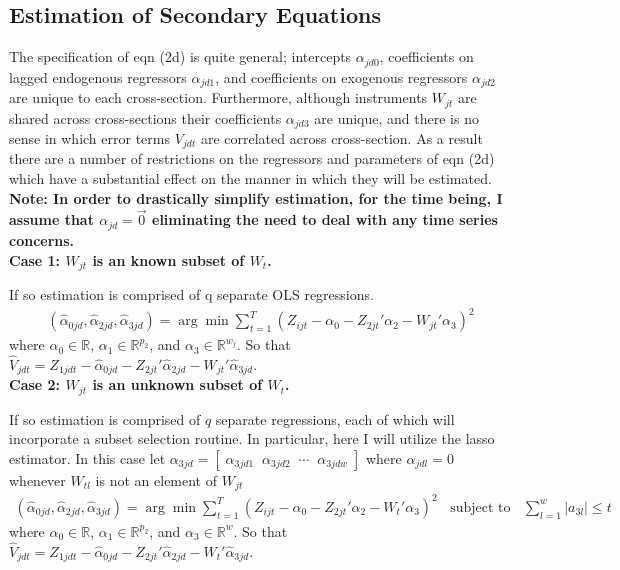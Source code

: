 \documentclass[10pt]{article}
\begin{document}
\subsection*{Estimation of Secondary Equations} 
The specification of eqn (2d) is quite general; intercepts $\alpha_{jd0}$, coefficients on lagged endogenous regressors $\alpha_{jd1}$, and coefficients on exogenous regressors $\alpha_{jd2}$ are unique to each cross-section. Furthermore, although instruments $W_{jt}$ are shared across cross-sections their coefficients $\alpha_{jd3}$ are unique, and there is no sense in which error terms $V_{jdt}$ are correlated across cross-section. As a result there are a number of restrictions on the regressors and parameters of  eqn (2d) which have a substantial effect on the manner in which they will be estimated. \\

\noindent \bf Note: \rm In order to drastically simplify estimation, for the time being, I assume that $\alpha_{jd} = \vec{0}$ eliminating the need to deal with any time series concerns. \\

\noindent \bf Case 1: \rm $W_{jt}$ is an known subset of $W_{t}$.   \

\noindent If so estimation is comprised of q separate OLS regressions.
\begin{align*} 
(\hat{\alpha}_{0jd}, \hat{\alpha}_{2jd},\hat{\alpha}_{3jd})  = \arg \min \sum_{t=1}^T\left(Z_{ijt} - \alpha_{0} -  Z_{2jt}'\alpha_{2} - W_{jt}'\alpha_{3} \right)^2
\end{align*}
where $\alpha_0 \in \mathbb{R}$, $\alpha_{1} \in \mathbb{R}^{p_2}$, and $\alpha_{3} \in \mathbb{R}^{w_j}$. So that $\hat{V}_{jdt} = Z_{1jdt} - \hat{\alpha}_{0jd} - Z_{2jt}'\hat{\alpha}_{2jd} - W_{jt}'\hat{\alpha}_{3jd}$. \\

\noindent\bf Case 2: \rm $W_{jt}$ is an unknown subset of $W_{t}$. \

\noindent If so estimation is comprised of $q$ separate regressions, each of  which will incorporate a subset selection routine. In particular, here I will utilize the lasso estimator. In this case let $\alpha_{3jd} =  [\;\alpha_{3jd1} \;\; \alpha_{3jd2} \;\; \cdots \;\; \alpha_{3jdw} \; ]$ where $\alpha_{jdl} = 0$ whenever $W_{tl}$ is not an element of $W_{jt}$
%
\begin{align*} 
(\hat{\alpha}_{0jd}, \hat{\alpha}_{2jd},\hat{\alpha}_{3jd})  = \arg \min \sum_{t=1}^T\left(Z_{ijt} - \alpha_{0} -  Z_{2jt}'\alpha_{2} - W_{t}'\alpha_{3} \right)^2 \;\; \text{ subject to } \;\; \sum_{l = 1}^w |a_{3l}| \leq t
\end{align*}
where $\alpha_0 \in \mathbb{R}$, $\alpha_{1} \in \mathbb{R}^{p_2}$, and $\alpha_{3} \in \mathbb{R}^{w}$. So that $\hat{V}_{jdt} = Z_{1jdt} -\hat{\alpha}_{0jd} - Z_{2jt}'\hat{\alpha}_{2jd} - W_{t}'\hat{\alpha}_{3jd}$. \\
\end{document}
